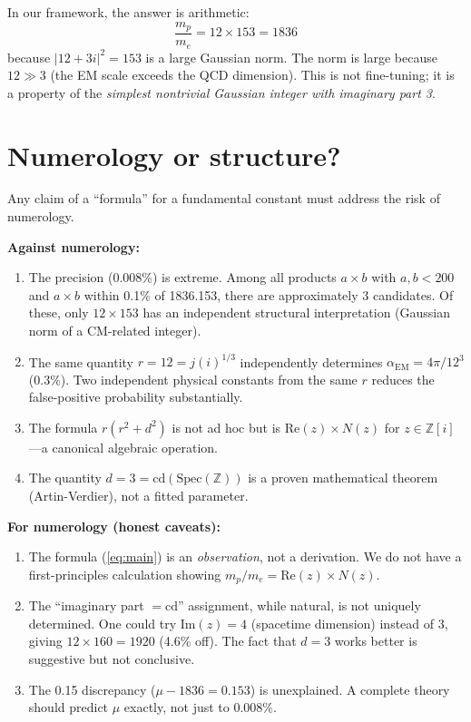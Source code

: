 \documentclass[aps,prl,twocolumn,superscriptaddress,nofootinbib]{revtex4-2}
\newcommand{\Z}{\mathbb{Z}}
\newcommand{\Spec}{\mathrm{Spec}}
\newcommand{\cd}{\mathrm{cd}}
\begin{document}
In our framework, the answer is arithmetic:
\begin{equation}
  \frac{m_p}{m_e} = 12 \times 153 = 1836
\end{equation}
because $|12 + 3i|^2 = 153$ is a large Gaussian norm.
The norm is large because $12 \gg 3$
(the EM scale exceeds the QCD dimension).
This is not fine-tuning; it is a property of the
\emph{simplest nontrivial Gaussian integer with imaginary part 3}.

\section{Numerology or structure?}

Any claim of a ``formula'' for a fundamental constant
must address the risk of numerology.

\textbf{Against numerology:}
\begin{enumerate}
\item The precision (0.008\%) is extreme.
  Among all products $a \times b$ with $a, b < 200$ and
  $a \times b$ within 0.1\% of 1836.153, there are approximately
  3 candidates.  Of these, only $12 \times 153$ has an independent
  structural interpretation (Gaussian norm of a CM-related integer).

\item The same quantity $r = 12 = j(i)^{1/3}$ independently
  determines $\alpha_{\mathrm{EM}} = 4\pi/12^3$ (0.3\%).
  Two independent physical constants from the same $r$
  reduces the false-positive probability substantially.

\item The formula $r(r^2 + d^2)$ is not ad hoc but is
  $\mathrm{Re}(z) \times N(z)$ for $z \in \Z[i]$---a canonical
  algebraic operation.

\item The quantity $d = 3 = \cd(\Spec(\Z))$ is a proven
  mathematical theorem (Artin-Verdier), not a fitted parameter.
\end{enumerate}

\textbf{For numerology (honest caveats):}
\begin{enumerate}
\item The formula (\ref{eq:main}) is an \emph{observation},
  not a derivation.  We do not have a first-principles calculation
  showing $m_p / m_e = \mathrm{Re}(z) \times N(z)$.

\item The ``imaginary part $= \cd$'' assignment, while natural,
  is not uniquely determined.  One could try $\mathrm{Im}(z) = 4$ (spacetime
  dimension) instead of 3, giving $12 \times 160 = 1920$ (4.6\% off).
  The fact that $d = 3$ works better is suggestive but not conclusive.

\item The 0.15 discrepancy ($\mu - 1836 = 0.153$) is unexplained.
  A complete theory should predict $\mu$ exactly, not just
  to 0.008\%.
\end{enumerate}
\end{document}
